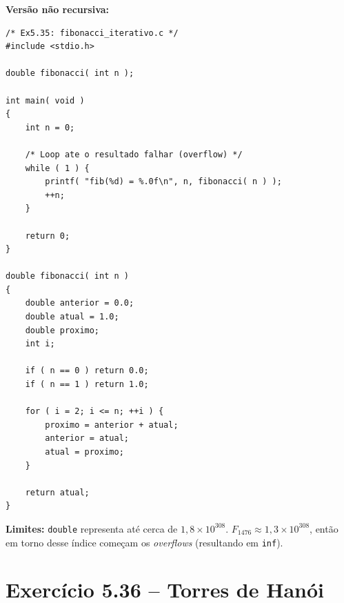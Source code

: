 \documentclass[12pt,a4paper]{article}
\begin{document}
\begin{respostabox}
\textbf{Versão não recursiva:}
\begin{lstlisting}
/* Ex5.35: fibonacci_iterativo.c */
#include <stdio.h>

double fibonacci( int n );

int main( void )
{
    int n = 0;

    /* Loop ate o resultado falhar (overflow) */
    while ( 1 ) {
        printf( "fib(%d) = %.0f\n", n, fibonacci( n ) );
        ++n;
    }

    return 0;
}

double fibonacci( int n )
{
    double anterior = 0.0;
    double atual = 1.0;
    double proximo;
    int i;

    if ( n == 0 ) return 0.0;
    if ( n == 1 ) return 1.0;

    for ( i = 2; i <= n; ++i ) {
        proximo = anterior + atual;
        anterior = atual;
        atual = proximo;
    }

    return atual;
}
\end{lstlisting}

\textbf{Limites:} \texttt{double} representa até cerca de $1{,}8 \times 10^{308}$.
$F_{1476} \approx 1{,}3 \times 10^{308}$, então em torno desse índice começam os
\textit{overflows} (resultando em \texttt{inf}).
\end{respostabox}

\newpage

\section{Exercício 5.36 -- Torres de Hanói}
\end{document}
